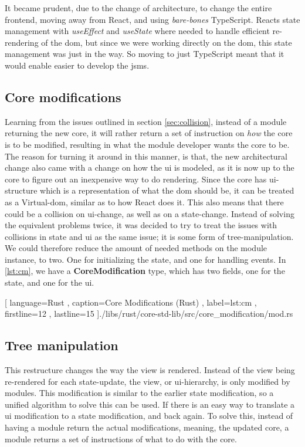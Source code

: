 It became prudent, due to the change of architecture, to change the entire
frontend, moving away from React, and using \textit{bare-bones} TypeScript.
Reacts state management with \textit{useEffect} and \textit{useState} where
needed to handle efficient re-rendering of the \gls{dom}, but since we were
working directly on the \gls{dom}, this state management was just in the way. So
moving to just TypeScript meant that it would enable easier to develop the
\gls*{jsms}.

\subsection{Core modifications}

Learning from the issues outlined in section \ref{sec:collision}, instead of a
module returning the new core, it will rather return a set of instruction on
\textit{how} the core is to be modified, resulting in what the module developer
wants the core to be. The reason for turning it around in this manner, is that,
the new architectural change also came with a change on how the \gls*{ui} is
modeled, as it is now up to the core to figure out an inexpensive way to do
rendering. Since the core has \gls*{ui}-structure which is a representation of
what the \gls*{dom} should be, it can be treated as a Virtual-\gls*{dom}, similar
as to how React does it. This also means that there could be a collision on
\gls*{ui}-change, as well as on a state-change. Instead of solving the equivalent
problems twice, it was decided to try to treat the issues with collisions in
state and \gls*{ui} as the same issue; it is some form of tree-manipulation. We
could therefore reduce the amount of needed methods on the module instance, to
two. One for initializing the state, and one for handling events. In
\ref{lst:cm}, we have a \textbf{CoreModification} type, which has two fields,
one for the state, and one for the \gls*{ui}.

\begin{center}
  
    [ language=Rust
    , caption={Core Modifications (Rust)}
    , label=lst:cm
    , firstline=12
    , lastline=15
    ]{./libs/rust/core-std-lib/src/core_modification/mod.rs}
\end{center}

\subsection{Tree manipulation}

This restructure changes the way the view is rendered. Instead of the view being
re-rendered for each state-update, the view, or \gls*{ui}-hierarchy, is only
modified by modules. This modification is similar to the earlier state
modification, so a unified algorithm to solve this can be used. If there is an
easy way to translate a \gls*{ui} modification to a state modification, and back
again. To solve this, instead of having a module return the actual
modifications, meaning, the updated core, a module returns a set of instructions
of what to do with the core.

